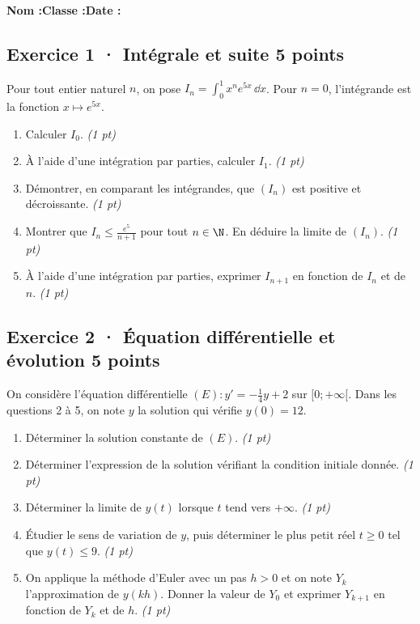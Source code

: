 \smallskip\textbf{Nom :}\enspace\dotfill\quad\textbf{Classe :}\enspace\dotfill\quad\textbf{Date :}\enspace\dotfill

\subsection*{Exercice 1 · Intégrale et suite \hfill 5 points}Pour tout entier naturel $n$, on pose $I_n=\displaystyle\int_0^1x^ne^{5x}\,\dd x$. Pour $n=0$, l'intégrande est la fonction $x\mapsto e^{5x}$.

\begin{enumerate}

\item Calculer $I_0$. \hfill\textit{(1 pt)}

\item À l'aide d'une intégration par parties, calculer $I_1$. \hfill\textit{(1 pt)}

\item Démontrer, en comparant les intégrandes, que $(I_n)$ est positive et décroissante. \hfill\textit{(1 pt)}

\item Montrer que $I_n\le\frac{e^{5}}{n+1}$ pour tout $n\in\N$. En déduire la limite de $(I_n)$. \hfill\textit{(1 pt)}

\item À l'aide d'une intégration par parties, exprimer $I_{n+1}$ en fonction de $I_n$ et de $n$. \hfill\textit{(1 pt)}

\end{enumerate}

\subsection*{Exercice 2 · Équation différentielle et évolution \hfill 5 points}On considère l'équation différentielle $(E):y'=-\frac1{4}y+2$ sur $[0;+\infty[$. Dans les questions 2 à 5, on note $y$ la solution qui vérifie $y(0)=12$.

\begin{enumerate}

\item Déterminer la solution constante de $(E)$. \hfill\textit{(1 pt)}

\item Déterminer l'expression de la solution vérifiant la condition initiale donnée. \hfill\textit{(1 pt)}

\item Déterminer la limite de $y(t)$ lorsque $t$ tend vers $+\infty$. \hfill\textit{(1 pt)}

\item Étudier le sens de variation de $y$, puis déterminer le plus petit réel $t\ge0$ tel que $y(t)\le9$. \hfill\textit{(1 pt)}

\item On applique la méthode d'Euler avec un pas $h>0$ et on note $Y_k$ l'approximation de $y(kh)$. Donner la valeur de $Y_0$ et exprimer $Y_{k+1}$ en fonction de $Y_k$ et de $h$. \hfill\textit{(1 pt)}

\end{enumerate}


